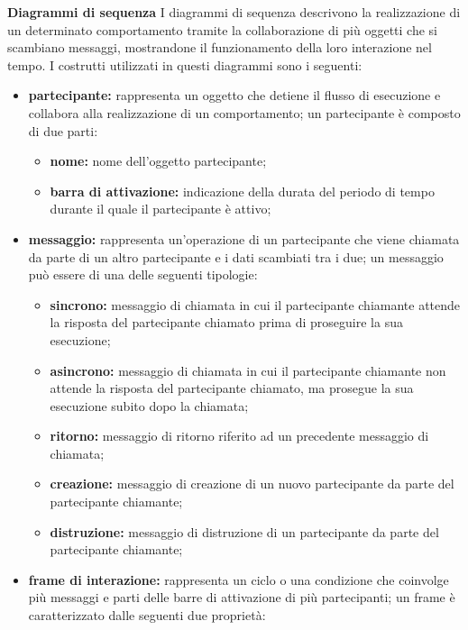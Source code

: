 						\textbf{Diagrammi di sequenza}
						\newline
						\newline
						I diagrammi di sequenza descrivono la realizzazione di un determinato comportamento tramite la collaborazione di più oggetti che si scambiano messaggi, mostrandone il funzionamento della loro interazione nel tempo.
						\newline
						I costrutti utilizzati in questi diagrammi sono i seguenti:
						\begin{itemize}
							\item \textbf{partecipante:} rappresenta un oggetto che detiene il flusso di esecuzione e collabora alla realizzazione di un comportamento; un partecipante è composto di due parti:
							\begin{itemize}
								\item \textbf{nome:} nome dell'oggetto partecipante;
								\item \textbf{barra di attivazione:} indicazione della durata del periodo di tempo durante il quale il partecipante è attivo;
							\end{itemize}
							\item \textbf{messaggio:} rappresenta un'operazione di un partecipante che viene chiamata da parte di un altro partecipante e i dati scambiati tra i due; un messaggio può essere di una delle seguenti tipologie:
							\begin{itemize}
								\item \textbf{sincrono:} messaggio di chiamata in cui il partecipante chiamante attende la risposta del partecipante chiamato prima di proseguire la sua esecuzione;
								\item \textbf{asincrono:} messaggio di chiamata in cui il partecipante chiamante non attende la risposta del partecipante chiamato, ma prosegue la sua esecuzione subito dopo la chiamata;
								\item \textbf{ritorno:} messaggio di ritorno riferito ad un precedente messaggio di chiamata;
								\item \textbf{creazione:} messaggio di creazione di un nuovo partecipante da parte del partecipante chiamante;
								\item \textbf{distruzione:} messaggio di distruzione di un partecipante da parte del partecipante chiamante;
							\end{itemize}
							\item \textbf{frame di interazione:} rappresenta un ciclo o una condizione che coinvolge più messaggi e parti delle barre di attivazione di più partecipanti; un frame è caratterizzato dalle seguenti due proprietà:

\end{itemize}
